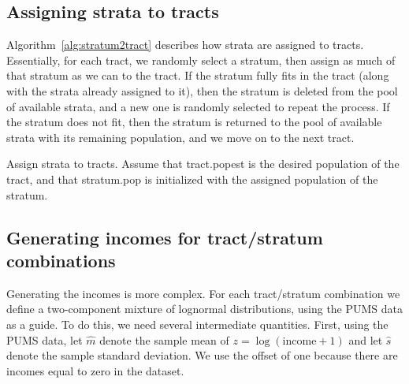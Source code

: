\documentclass[12pt]{article}
\begin{document}
\subsection{Assigning strata to tracts}
Algorithm~\ref{alg:stratum2tract} describes how strata are assigned to tracts. Essentially, for each tract, we randomly select a stratum, then assign as much of that stratum as we can to the tract. If the stratum fully fits in the tract (along with the strata already assigned to it), then the stratum is deleted from the pool of available strata, and a new one is randomly selected to repeat the process. If the stratum does not fit, then the stratum is returned to the pool of available strata with its remaining population, and we move on to the next tract.
\begin{algorithm}[ht]
  \begin{algorithmic}
  \item
    \ENDWHILE
    \ENDFOR
  \end{algorithmic}
  \caption{Assign strata to tracts. Assume that tract.popest is the desired population of the tract, and that stratum.pop is initialized with the assigned population of the stratum.}
  \label{alg:stratum2tract}
\end{algorithm}

\subsection{Generating incomes for tract/stratum combinations}
Generating the incomes is more complex. For each tract/stratum combination we define a two-component mixture of lognormal distributions, using the PUMS data as a guide. To do this, we need several intermediate quantities. First, using the PUMS data, let $\widehat{m}$ denote the sample mean of $z = \log(\mathrm{income} + 1)$ and let $\widehat{s}$ denote the sample standard deviation. We use the offset of one because there are incomes equal to zero in the dataset.
\end{document}
